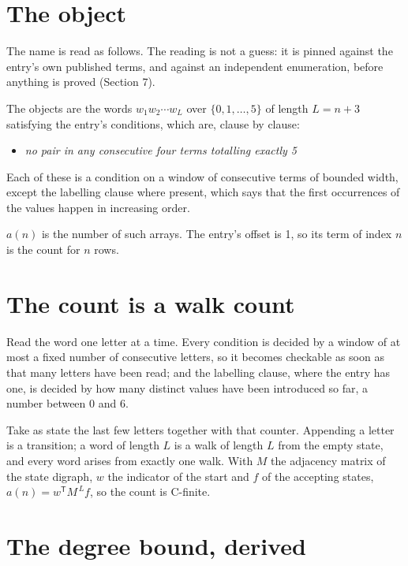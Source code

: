 \documentclass[11pt]{article}
\theoremstyle{definition}
\begin{document}
\section{The object}

The name is read as follows. The reading is not a guess: it is pinned against the entry's own published terms, and against an independent enumeration, before anything is proved (Section 7).

The objects are the words $w_1 w_2 \cdots w_L$ over $\{0,1,\dots,5\}$ of length $L = n + 3$ satisfying the entry's conditions, which are, clause by clause:

\begin{itemize}

\item {\itshape no pair in any consecutive four terms totalling exactly 5}

\end{itemize}

Each of these is a condition on a window of consecutive terms of bounded width, except the labelling clause where present, which says that the first occurrences of the values happen in increasing order.

$a(n)$ is the number of such arrays. The entry's offset is 1, so its term of index $n$ is the count for $n$ rows.

\section{The count is a walk count}

Read the word one letter at a time. Every condition is decided by a window of at most a fixed number of consecutive letters, so it becomes checkable as soon as that many letters have been read; and the labelling clause, where the entry has one, is decided by how many distinct values have been introduced so far, a number between $0$ and 6.

Take as state the last few letters together with that counter. Appending a letter is a transition; a word of length $L$ is a walk of length $L$ from the empty state, and every word arises from exactly one walk. With $M$ the adjacency matrix of the state digraph, $w$ the indicator of the start and $f$ of the accepting states, $a(n) = w^{\mathsf T}M^{\,L}f$, so the count is C-finite.

\section{The degree bound, derived}
\end{document}
